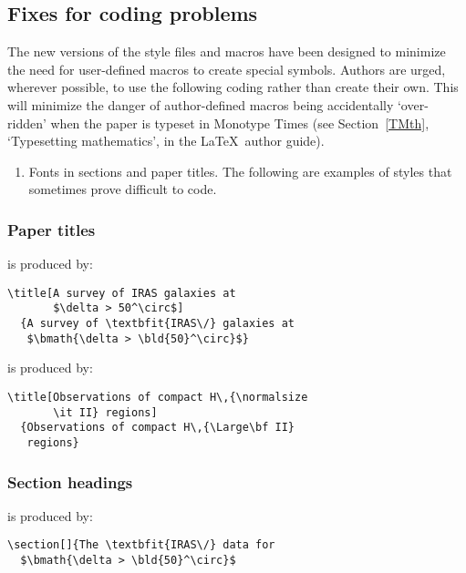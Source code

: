         
\subsection{Fixes for coding problems}

The new versions of the style files and macros have been designed
to  minimize the need for user-defined macros to  create  special
symbols. Authors are urged, wherever possible, to use the following
coding rather than create their own. This will minimize  the
danger of author-defined macros being accidentally  `over-ridden'
when the paper is typeset in Monotype Times (see Section~\ref{TMth},
`Typesetting  mathematics', in the \LaTeX\ author guide).
%
\begin{enumerate}
\item Fonts in sections and paper titles. The following are  examples
of styles that sometimes prove difficult to code.
\end{enumerate}


\subsubsection*{P\lowercase{aper titles}}

%
is produced by:
%
\begin{verbatim}
\title[A survey of IRAS galaxies at
       $\delta > 50^\circ$]
  {A survey of \textbfit{IRAS\/} galaxies at
   $\bmath{\delta > \bld{50}^\circ}$}
\end{verbatim}
\bigskip

%
is produced by:
%
\begin{verbatim}
\title[Observations of compact H\,{\normalsize
       \it II} regions]
  {Observations of compact H\,{\Large\bf II}
   regions}
\end{verbatim}


\subsubsection*{S\lowercase{ection headings}}

%
is produced by:
%
\begin{verbatim}
\section[]{The \textbfit{IRAS\/} data for
  $\bmath{\delta > \bld{50}^\circ}$
\end{verbatim}
\bigskip

